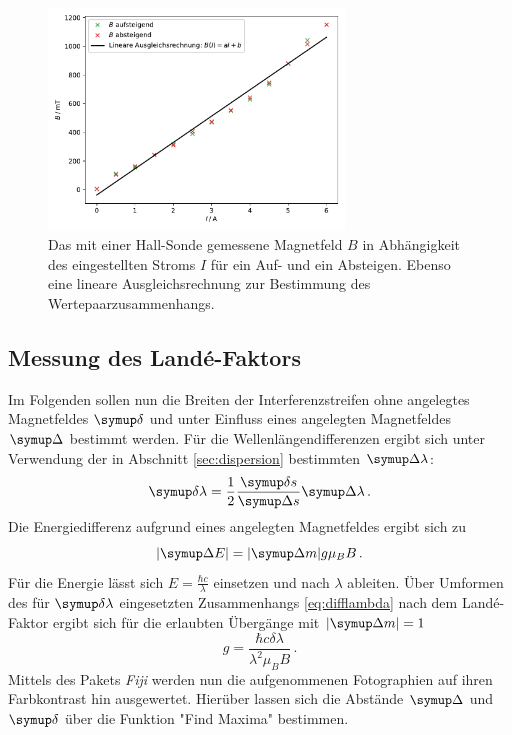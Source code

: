 \begin{figure}
  \centering
  \includegraphics[width=0.7\textwidth]{plots/eichung.pdf}
  \caption{Das mit einer Hall-Sonde gemessene Magnetfeld $B$ in Abhängigkeit des eingestellten Stroms $I$ für ein Auf- und ein Absteigen. Ebenso eine lineare Ausgleichsrechnung zur Bestimmung des Wertepaarzusammenhangs.}
  \label{abb:eichung}
\end{figure}

\subsection{Messung des Landé-Faktors}
Im Folgenden sollen nun die Breiten der Interferenzstreifen ohne angelegtes Magnetfeldes $\deltaup$ und unter Einfluss eines angelegten Magnetfeldes $\Deltaup$ bestimmt werden.
Für die Wellenlängendifferenzen ergibt sich unter Verwendung der in Abschnitt \ref{sec:dispersion} bestimmten $\Deltaup \lambda$:
\begin{equation}
  \deltaup \lambda = \frac{1}{2}\frac{\deltaup s}{\Deltaup s}\Deltaup \lambda\,.
  \label{eq:difflambda}
\end{equation}
Die Energiedifferenz aufgrund eines angelegten Magnetfeldes ergibt sich zu
\begin{equation}
  |\Deltaup E| = |\Deltaup m| g \mu_B B\,.
\end{equation}
Für die Energie lässt sich $E=\frac{\hbar c}{\lambda}$ einsetzen und nach $\lambda$ ableiten.
Über Umformen des für $\deltaup \lambda$ eingesetzten Zusammenhangs \eqref{eq:difflambda} nach dem Landé-Faktor ergibt sich für die erlaubten Übergänge mit $|\Deltaup m|=1$
\begin{equation}
  g=\frac{\hbar c \delta \lambda}{\lambda^2 \mu_B B}\,.
\end{equation}
Mittels des Pakets \textit{Fiji} werden nun die aufgenommenen Fotographien auf ihren Farbkontrast hin ausgewertet.
Hierüber lassen sich die Abstände $\Deltaup$ und $\deltaup$ über die Funktion "Find Maxima" bestimmen.

